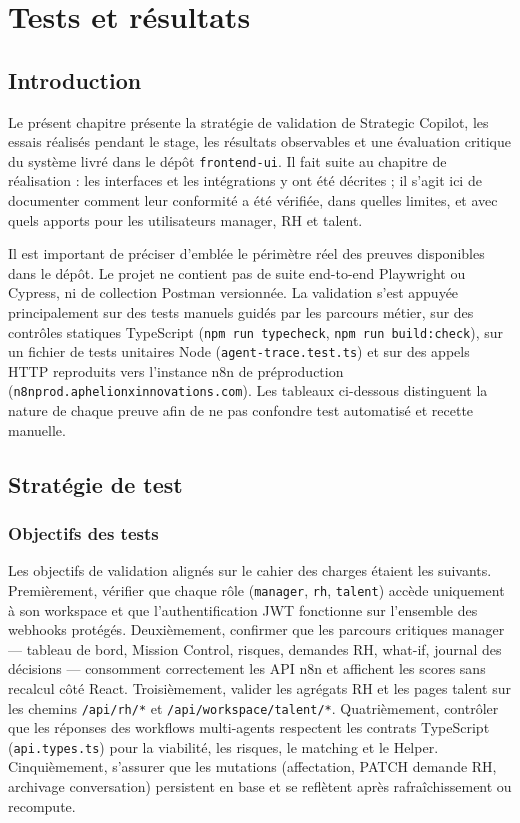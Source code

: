 \chapter{Tests et résultats}

\section{Introduction}

Le présent chapitre présente la stratégie de validation de Strategic Copilot, les essais réalisés pendant le stage, les résultats observables et une évaluation critique du système livré dans le dépôt \texttt{frontend-ui}. Il fait suite au chapitre de réalisation : les interfaces et les intégrations y ont été décrites ; il s'agit ici de documenter comment leur conformité a été vérifiée, dans quelles limites, et avec quels apports pour les utilisateurs manager, RH et talent.

Il est important de préciser d'emblée le périmètre réel des preuves disponibles dans le dépôt. Le projet ne contient pas de suite end-to-end Playwright ou Cypress, ni de collection Postman versionnée. La validation s'est appuyée principalement sur des tests manuels guidés par les parcours métier, sur des contrôles statiques TypeScript (\texttt{npm run typecheck}, \texttt{npm run build:check}), sur un fichier de tests unitaires Node (\texttt{agent-trace.test.ts}) et sur des appels HTTP reproduits vers l'instance n8n de préproduction (\texttt{n8nprod.aphelionxinnovations.com}). Les tableaux ci-dessous distinguent la nature de chaque preuve afin de ne pas confondre test automatisé et recette manuelle.

\section{Stratégie de test}

\subsection{Objectifs des tests}

Les objectifs de validation alignés sur le cahier des charges étaient les suivants. Premièrement, vérifier que chaque rôle (\texttt{manager}, \texttt{rh}, \texttt{talent}) accède uniquement à son workspace et que l'authentification JWT fonctionne sur l'ensemble des webhooks protégés. Deuxièmement, confirmer que les parcours critiques manager --- tableau de bord, Mission Control, risques, demandes RH, what-if, journal des décisions --- consomment correctement les API n8n et affichent les scores sans recalcul côté React. Troisièmement, valider les agrégats RH et les pages talent sur les chemins \texttt{/api/rh/*} et \texttt{/api/workspace/talent/*}. Quatrièmement, contrôler que les réponses des workflows multi-agents respectent les contrats TypeScript (\texttt{api.types.ts}) pour la viabilité, les risques, le matching et le Helper. Cinquièmement, s'assurer que les mutations (affectation, PATCH demande RH, archivage conversation) persistent en base et se reflètent après rafraîchissement ou recompute.

